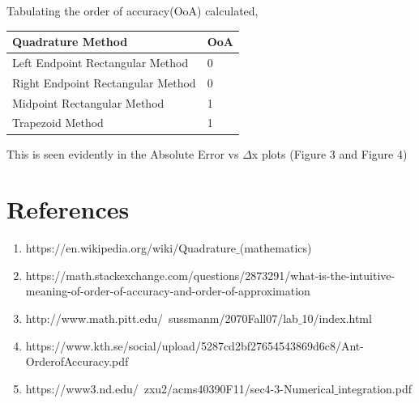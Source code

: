 \documentclass[11pt]{article}
\begin{document}
Tabulating the order of accuracy(OoA) calculated,\\
\begin{table} [h!]
	\centering
\begin{tabular}{| l || l |}
	\hline
	Quadrature Method & OoA  \\
	\hline \hline
	Left Endpoint Rectangular Method & 0\\
	\hline 
	Right Endpoint Rectangular Method & 0 \\
	\hline 
	Midpoint Rectangular Method & 1 \\
	\hline
	Trapezoid Method & 1 \\
	\hline
\end{tabular}
\end{table}

This is seen evidently in the Absolute Error vs $\Delta$x plots (Figure 3 and Figure 4)

\section{References}
\begin{enumerate}
	\item https://en.wikipedia.org/wiki/Quadrature$\_$(mathematics)
	\item https://math.stackexchange.com/questions/2873291/what-is-the-intuitive-meaning-of-order-of-accuracy-and-order-of-approximation
	\item http://www.math.pitt.edu/~sussmanm/2070Fall07/lab$\_$10/index.html
	\item https://www.kth.se/social/upload/5287cd2bf27654543869d6c8/Ant-OrderofAccuracy.pdf
	\item https://www3.nd.edu/~zxu2/acms40390F11/sec4-3-Numerical$\_$integration.pdf
\end{enumerate}
\end{document}
